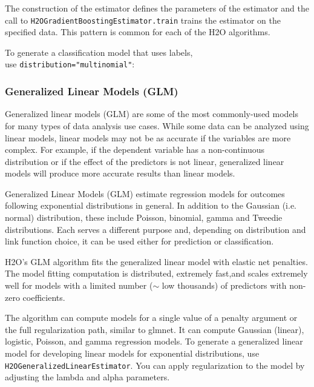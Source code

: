 {The construction of the estimator
defines the parameters of the estimator and the call to
{\texttt{H2OGradientBoostingEstimator.train}}  trains the estimator on
the specified data.  This pattern is common for each of the H2O algorithms.



To generate a classification model that uses labels, \\ use 
{\texttt{distribution="multinomial"}}:



\subsubsection{Generalized Linear Models (GLM)}
Generalized linear models (GLM) are some of the most commonly-used
models for many types of data analysis use cases. While some data
can be analyzed using linear models, linear models
may not be as accurate if the variables are more complex.
For example, if the dependent variable has a non-continuous
distribution or if the effect of the predictors is not linear,
generalized linear models will produce more accurate results than linear models.

Generalized Linear Models (GLM) estimate regression models for
outcomes following exponential distributions in general. In
addition to the Gaussian (i.e. normal) distribution, these include
Poisson, binomial, gamma and Tweedie distributions. Each serves
a different purpose and, depending on distribution and link
function choice, it can be used either for prediction or
classification.

H2O's GLM algorithm fits the generalized linear model with
elastic net penalties. The model fitting computation is distributed,
extremely fast,and scales extremely well for models with a limited
number ($\sim$ low thousands) of predictors with non-zero
coefficients. 

The algorithm can compute models for a single value of a penalty argument or the full regularization path, similar to glmnet. It can compute Gaussian (linear), logistic, Poisson, and gamma regression models.
To generate a generalized linear model for developing
linear models for exponential distributions, use
{\texttt{H2OGeneralizedLinearEstimator}}. You can apply
regularization to the model by adjusting the lambda and alpha
parameters.

}
